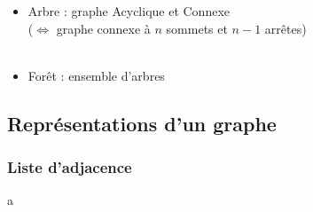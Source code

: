 \documentclass{beamer}
\let\oldsubsubsection\subsubsection
\renewcommand{\subsubsection}[2][]{\def\currentsubsubsection{#2}\oldsubsubsection[#1]{#2}}
\begin{document}
\begin{frame}
    \begin{itemize}
        \item Arbre : graphe Acyclique et Connexe
        \\($\Leftrightarrow$ graphe connexe à $n$ sommets et $n-1$ arrêtes)
        \\\usebox\arbre
        \\[0.3cm]
        \item Forêt : ensemble d'arbres
    \end{itemize}
\end{frame}

\subsection{Représentations d'un graphe}
\subsubsection{Liste d'adjacence}
\begin{frame}
    a
\end{frame}
\end{document}
